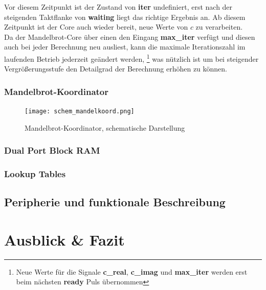 \documentclass[a4paper,12pt,onesided]{report}
\begin{document}
Vor diesem Zeitpunkt ist der Zustand von \textbf{iter} undefiniert, erst nach der steigenden Taktflanke von \textbf{waiting} liegt das richtige Ergebnis an.
Ab diesem Zeitpunkt ist der Core auch wieder bereit, neue Werte von $c$ zu verarbeiten.\\
Da der Mandelbrot-Core über einen den Eingang \textbf{max\_iter} verfügt und diesen auch bei jeder Berechnung neu ausliest, kann die maximale Iterationszahl im laufenden Betrieb jederzeit geändert werden,
\footnote{Neue Werte für die Signale \textbf{c\_real}, \textbf{c\_imag} und \textbf{max\_iter} werden erst beim nächsten \textbf{ready} Puls übernommen}
was nützlich ist um bei steigender Vergrößerungsstufe den Detailgrad der Berechnung erhöhen zu können.


\subsection{Mandelbrot-Koordinator}
\begin{figure}[H]
	\centering
	\texttt{[image: schem\_mandelkoord.png]}
	\caption{Mandelbrot-Koordinator, schematische Darstellung}
	\label{fig:schem_mandelbrotkoord}
\end{figure}

\subsection{Dual Port Block RAM}
\subsection{Lookup Tables}
\section{Peripherie und funktionale Beschreibung}

\chapter{Ausblick \& Fazit}


{}

\end{document}
